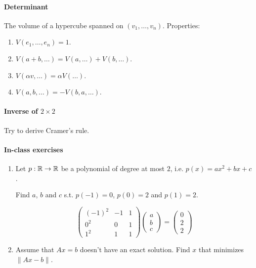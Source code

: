 \documentclass{article}
\begin{document}
\paragraph{Determinant} The volume of a hypercube spanned on $(v_1,\dots,v_n)$. Properties:
\begin{enumerate}
    \item $V(e_1, \dots, e_n) = 1$.
    \item $V(a+b, \dots) = V(a, \dots) + V(b, \dots)$.
    \item $V(\alpha v, \dots) = \alpha V(\dots)$.
    \item $V(a, b, \dots) = -V(b, a, \dots)$.
\end{enumerate}

\paragraph{Inverse of $2 \times 2$} Try to derive Cramer's rule.

\paragraph{In-class exercises}

\begin{enumerate}
    \item Let $p : \mathbb{R} \to \mathbb{R}$ be a polynomial of degree at most $2$, i.e. $p(x) = ax^2+bx+c$.
    
    Find $a$, $b$ and $c$ s.t. $p(-1)=0$, $p(0)=2$ and $p(1) = 2$.

    $$
    \begin{pmatrix}
        (-1)^2 & -1 & 1 \\
        0^2 & 0 & 1 \\
        1^2 & 1 & 1
    \end{pmatrix} \begin{pmatrix} a \\ b \\ c \end{pmatrix} = 
    \begin{pmatrix}0 \\ 2 \\ 2\end{pmatrix}
    $$
    \item Assume that $Ax=b$ doesn't have an exact solution. Find $x$ that minimizes $\|Ax-b\|$.
\end{enumerate}
\end{document}
